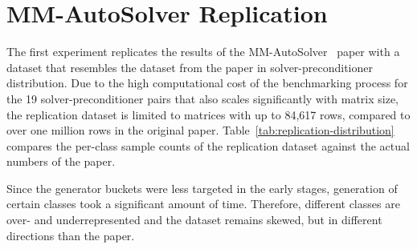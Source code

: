 \section{MM-AutoSolver Replication}\label{sec:mm-replication}

The first experiment replicates the results of the MM-AutoSolver~\cite{xiong2025mmautosolver} paper with a dataset that resembles the
dataset from the paper in solver-preconditioner distribution.
Due to the high computational cost of the benchmarking process for the 19 solver-preconditioner pairs that also scales significantly with matrix size,
the replication dataset is limited to matrices with up to 84{,}617 rows, compared to over one million rows in the original paper.
Table~\ref{tab:replication-distribution} compares the per-class sample counts of the replication dataset against the actual numbers of the paper.

Since the generator buckets were less targeted in the early stages, generation of certain classes took a significant amount of time.
Therefore, different classes are over- and underrepresented and the dataset remains skewed, but in different directions than the paper.

